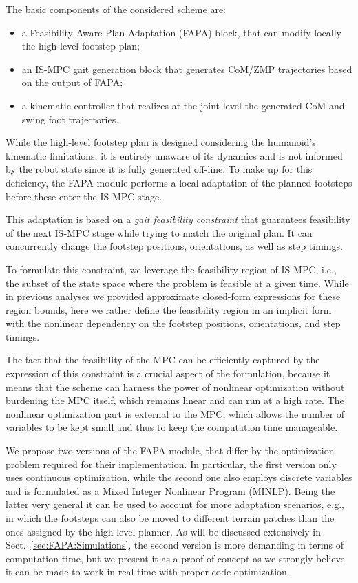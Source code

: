 The basic components of the considered scheme are:
\begin{itemize}
    \item a Feasibility-Aware Plan Adaptation (FAPA) block, that can modify locally
        the high-level footstep plan;
    \item an IS-MPC gait generation block that generates CoM/ZMP trajectories based
        on the output of FAPA;
    \item a kinematic controller that realizes at the joint level the generated
        CoM and swing foot trajectories.
\end{itemize}

While the high-level footstep plan is designed considering the humanoid's
kinematic limitations, it is entirely unaware of its dynamics and is not
informed by the robot state since it is fully generated off-line.
To make up for this deficiency, the FAPA module performs a local adaptation of
the planned footsteps before these enter the IS-MPC stage. 

This adaptation is based on a {\em gait feasibility constraint} that guarantees
feasibility of the next IS-MPC stage while trying to match the original plan.
It can concurrently change the footstep positions, orientations, as well as
step timings. 

To formulate this constraint, we leverage the feasibility region of IS-MPC,
i.e., the subset of the state space where the problem is feasible at a given
time. While in previous analyses we provided approximate closed-form
expressions for these region bounds, here we rather define the feasibility
region in an implicit form with the nonlinear dependency on the footstep
positions, orientations, and step timings.

The fact that the feasibility of the MPC can be efficiently captured by
the expression of this constraint is a crucial aspect of the formulation,
because it means that the scheme can harness the power of nonlinear
optimization without burdening the MPC itself, which remains linear and can
run at a high rate. The nonlinear optimization part is external to the MPC,
which allows the number of variables to be kept small and thus to keep the
computation time manageable.

We propose two versions of the FAPA module, that differ by the optimization
problem required for their implementation. In particular, the first version
only uses continuous optimization, while the second one also employs discrete
variables and is formulated as a Mixed Integer Nonlinear Program (MINLP).
Being the latter very general it can be used to account for more adaptation
scenarios, e.g., in which the footsteps can also be moved to different terrain
patches than the ones assigned by the high-level planner. As will be discussed
extensively in Sect.~\ref{sec:FAPA:Simulations}, the second version is more
demanding in terms of computation time, but we present it as a proof of
concept as we strongly believe it can be made to work in real time with proper
code optimization.

